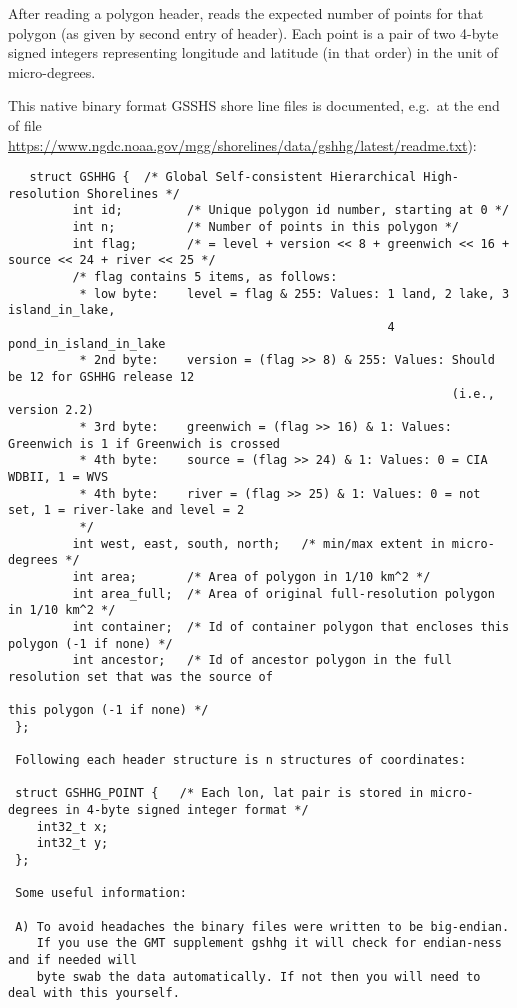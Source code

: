 After reading a polygon header, \ASKI{} reads the expected number of points for that polygon (as given by second
entry of header). Each point is a pair of two 4-byte signed integers representing longitude and latitude 
(in that order) in the unit of micro-degrees.

This native binary format GSSHS shore line files is documented, e.g.\ at the end of file 
\url{https://www.ngdc.noaa.gov/mgg/shorelines/data/gshhg/latest/readme.txt}):
{\scriptsize
\begin{verbatim}
   struct GSHHG {  /* Global Self-consistent Hierarchical High-resolution Shorelines */
         int id;         /* Unique polygon id number, starting at 0 */
         int n;          /* Number of points in this polygon */
         int flag;       /* = level + version << 8 + greenwich << 16 + source << 24 + river << 25 */
         /* flag contains 5 items, as follows:
          * low byte:    level = flag & 255: Values: 1 land, 2 lake, 3 island_in_lake, 
                                                     4 pond_in_island_in_lake
          * 2nd byte:    version = (flag >> 8) & 255: Values: Should be 12 for GSHHG release 12 
                                                              (i.e., version 2.2)
          * 3rd byte:    greenwich = (flag >> 16) & 1: Values: Greenwich is 1 if Greenwich is crossed
          * 4th byte:    source = (flag >> 24) & 1: Values: 0 = CIA WDBII, 1 = WVS
          * 4th byte:    river = (flag >> 25) & 1: Values: 0 = not set, 1 = river-lake and level = 2
          */
         int west, east, south, north;   /* min/max extent in micro-degrees */
         int area;       /* Area of polygon in 1/10 km^2 */
         int area_full;  /* Area of original full-resolution polygon in 1/10 km^2 */
         int container;  /* Id of container polygon that encloses this polygon (-1 if none) */
         int ancestor;   /* Id of ancestor polygon in the full resolution set that was the source of 
                                                                        this polygon (-1 if none) */
 };

 Following each header structure is n structures of coordinates:

 struct GSHHG_POINT {	/* Each lon, lat pair is stored in micro-degrees in 4-byte signed integer format */
 	int32_t x;
 	int32_t y;
 };

 Some useful information:

 A) To avoid headaches the binary files were written to be big-endian.
    If you use the GMT supplement gshhg it will check for endian-ness and if needed will
    byte swab the data automatically. If not then you will need to deal with this yourself.


\end{verbatim}}
